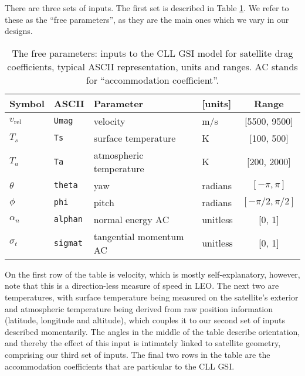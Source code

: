 \documentclass[12pt]{article}
\begin{document}
There are three sets of inputs.  The first set is described in Table
\ref{t:inputs}.  We refer to these as the ``free parameters'', as they are
the main ones which we vary in our designs.
\begin{table}[ht!]
\centering
\begin{tabular}{llllc}
Symbol & ASCII & Parameter & [units]  & Range \\
\hline
$v_{\mathrm{rel}}$ & {\tt Umag} & velocity & m/s & [5500, 9500] \\
$T_s$ & {\tt Ts} & surface temperature & K & [100, 500] \\ 
$T_a$ & {\tt Ta} & atmospheric temperature & K & [200, 2000] \\
$\theta$ & {\tt theta} & yaw & radians & $[-\pi, \pi]$ \\
$\phi$ & {\tt phi} & pitch & radians & $[-\pi/2, \pi/2]$ \\
$\alpha_n$ & {\tt alphan} & normal energy AC & unitless & [0, 1] \\
$\sigma_t$ & {\tt sigmat} & tangential momentum AC & unitless & [0, 1]
\end{tabular}
\caption{The free parameters: inputs to the CLL GSI model for satellite drag
coefficients, typical ASCII representation, units and ranges. AC stands for
``accommodation coefficient''.}
\label{t:inputs}
\end{table}
On the first row of the table is velocity, which is mostly self-explanatory, 
however, note that this is a direction-less measure of speed in LEO.  The next two are temperatures, with surface temperature being 
measured on the satellite's exterior and atmospheric temperature being derived 
from raw position information (latitude, longitude and altitude), which couples 
it to our second set of inputs described momentarily.  The angles in the middle 
of the table describe orientation, and thereby the effect of this input is 
intimately linked to satellite geometry, comprising our third set of inputs.  
The final two rows in the table are the accommodation coefficients that are 
particular to the CLL GSI.
 
\end{document}
